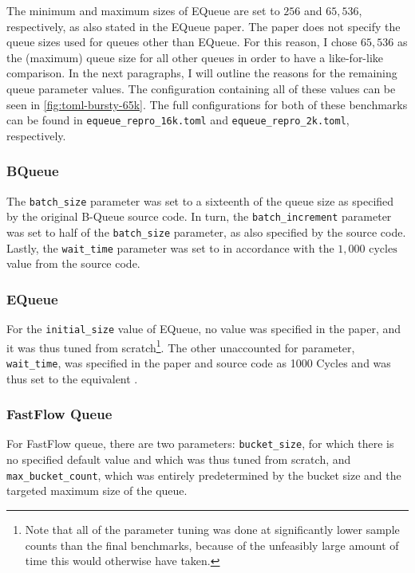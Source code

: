 The minimum and maximum sizes of EQueue are set to $256$ and $65,536$, respectively,
as also stated in the EQueue paper.
The paper does not specify the queue sizes used for queues other than EQueue.
For this reason, I chose $65,536$ as the (maximum) queue size for all other queues in order to have a
like-for-like comparison.
In the next paragraphs, I will outline the reasons for the remaining queue parameter values.
The configuration containing all of these values can be seen in \autoref{fig:toml-bursty-65k}.
The full configurations for both of these benchmarks can be found in \texttt{equeue\_repro\_16k.toml} and
\texttt{equeue\_repro\_2k.toml}, respectively.



\subsubsection*{BQueue}
The \texttt{batch\_size} parameter was set to a sixteenth of the queue size as specified by the original
B-Queue source code.
In turn, the \texttt{batch\_increment} parameter was set to half of the \texttt{batch\_size} parameter, as
also specified by the source code.
Lastly, the \texttt{wait\_time} parameter was set to  in accordance with the
$1,000\text{ cycles}$ value from the source code.

\subsubsection*{EQueue}
For the \texttt{initial\_size} value of EQueue, no value was specified in the paper, and it was thus tuned
from scratch\footnote{Note that all of the parameter tuning was done at significantly lower sample counts
than the final benchmarks, because of the unfeasibly large amount of time this would otherwise have taken.}.
The other unaccounted for parameter, \texttt{wait\_time}, was specified in the paper and source code as 1000
Cycles and was thus set to the equivalent .

\subsubsection*{FastFlow Queue}
For FastFlow queue, there are two parameters: \texttt{bucket\_size}, for which there is no specified default
value and which was thus tuned from scratch, and \texttt{max\_bucket\_count}, which was entirely predetermined by
the bucket size and the targeted maximum size of the queue.

